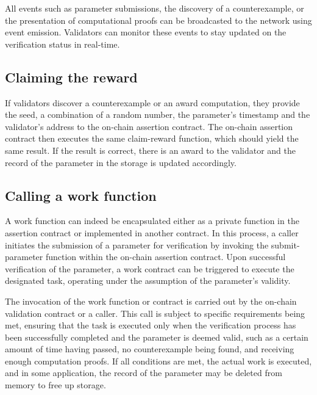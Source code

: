 \documentclass[runningheads]{llncs}
\begin{document}
All events such as parameter submissions, the discovery of a counterexample, or the presentation of computational proofs can be broadcasted to the network using event emission. Validators can monitor these events to stay updated on the verification status in real-time. 

\subsection{Claiming the reward} 
If validators discover a counterexample or an award computation, they provide the seed, a combination of a random number, the parameter's timestamp and the validator's address to the on-chain assertion contract. The on-chain assertion contract then executes the same claim-reward function, which should yield the same result.  If the result is correct, there is an award to the validator and the record of the parameter in the storage is updated accordingly. %


\subsection{Calling a work function}
A work function can indeed be encapsulated either as a private function in the assertion contract or implemented in another contract. In this process, a caller initiates the submission of a parameter for verification by invoking the submit-parameter function within the on-chain assertion contract. Upon successful verification of the parameter, a work contract can be triggered to execute the designated task, operating under the assumption of the parameter's validity.

The invocation of the work function or contract is carried out by the on-chain validation contract or a caller. This call is subject to specific requirements being met, ensuring that the task is executed only when the verification process has been successfully completed and the parameter is deemed valid, such as a certain amount of time having passed, no counterexample being found, and receiving enough computation proofs. If all conditions are met, the actual work is executed, and in some application, the record of the parameter may be deleted from memory to free up storage.

\end{document}
